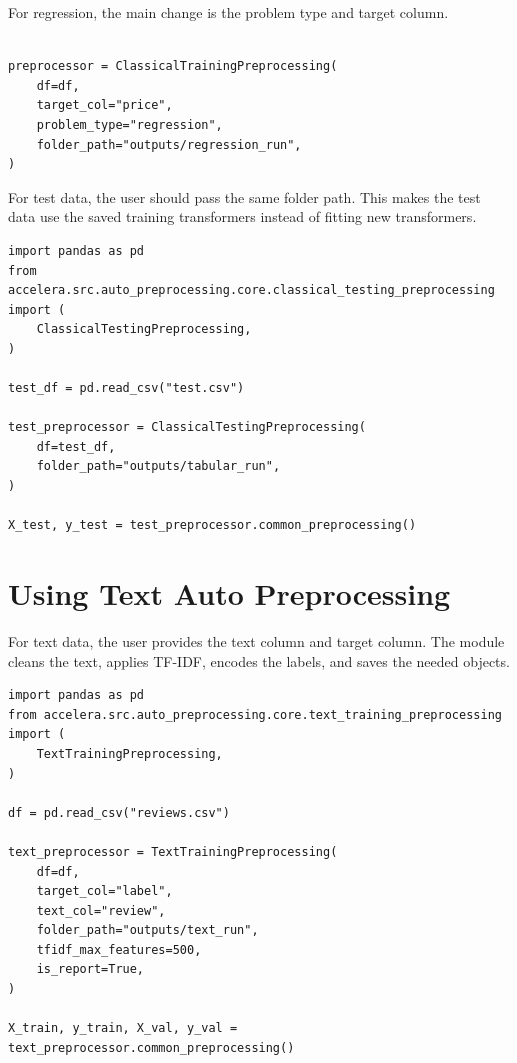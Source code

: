 \documentclass[12pt,a4paper]{report}
\begin{document}
\noindent For regression, the main change is the problem type and target column.

\begin{lstlisting}[style=code,caption={Calling tabular regression preprocessing}]

preprocessor = ClassicalTrainingPreprocessing(
    df=df,
    target_col="price",
    problem_type="regression",
    folder_path="outputs/regression_run",
)
\end{lstlisting}

\noindent For test data, the user should pass the same folder path. This makes the test
data use the saved training transformers instead of fitting new transformers.

\begin{lstlisting}[style=code,caption={Calling tabular testing preprocessing}]
import pandas as pd
from accelera.src.auto_preprocessing.core.classical_testing_preprocessing import (
    ClassicalTestingPreprocessing,
)

test_df = pd.read_csv("test.csv")

test_preprocessor = ClassicalTestingPreprocessing(
    df=test_df,
    folder_path="outputs/tabular_run",
)

X_test, y_test = test_preprocessor.common_preprocessing()
\end{lstlisting}

\section{Using Text Auto Preprocessing}

For text data, the user provides the text column and target column. The module
cleans the text, applies TF-IDF, encodes the labels, and saves the needed
objects.

\begin{lstlisting}[style=code,caption={Calling text training preprocessing}]
import pandas as pd
from accelera.src.auto_preprocessing.core.text_training_preprocessing import (
    TextTrainingPreprocessing,
)

df = pd.read_csv("reviews.csv")

text_preprocessor = TextTrainingPreprocessing(
    df=df,
    target_col="label",
    text_col="review",
    folder_path="outputs/text_run",
    tfidf_max_features=500,
    is_report=True,
)

X_train, y_train, X_val, y_val = text_preprocessor.common_preprocessing()
\end{lstlisting}
\end{document}
